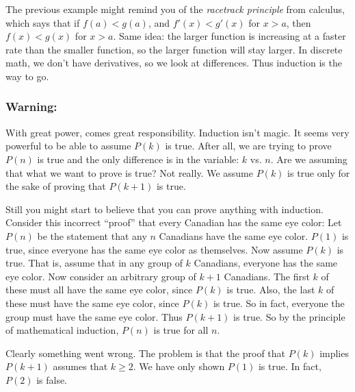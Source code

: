 \documentclass[10pt,]{book}
\theoremstyle{plain}
\theoremstyle{definition}
\theoremstyle{definition}
\theoremstyle{definition}
\numberwithin{equation}{chapter}
\newcommand{\lt}{ < }
\begin{document}
The previous example might remind you of the \emph{racetrack principle} from calculus, which says that if \(f(a) \lt  g(a)\), and \(f'(x) \lt  g'(x)\) for \(x > a\), then \(f(x) \lt  g(x)\) for \(x > a\). Same idea: the larger function is increasing at a faster rate than the smaller function, so the larger function will stay larger. In discrete math, we don't have derivatives, so we look at differences. Thus induction is the way to go.
%
\typeout{************************************************}
\typeout{************************************************}
\subsubsection[Warning:]{Warning:}\label{subsubsection-4}

With great power, comes great responsibility. Induction isn't magic. It seems very powerful to be able to assume \(P(k)\) is true. After all, we are trying to prove \(P(n)\) is true and the only difference is in the variable: \(k\) vs. \(n\). Are we assuming that what we want to prove is true? Not really. We assume \(P(k)\) is true only for the sake of proving that \(P(k+1)\) is true.
%
\par

Still you might start to believe that you can prove anything with induction. Consider this incorrect ``proof'' that every Canadian has the same eye color: Let \(P(n)\) be the statement that any \(n\) Canadians have the same eye color. \(P(1)\) is true, since everyone has the same eye color as themselves. Now assume \(P(k)\) is true. That is, assume that in any group of \(k\) Canadians, everyone has the same eye color. Now consider an arbitrary group of \(k+1\) Canadians. The first \(k\) of these must all have the same eye color, since \(P(k)\) is true. Also, the last \(k\) of these must have the same eye color, since \(P(k)\) is true. So in fact, everyone the group must have the same eye color. Thus \(P(k+1)\) is true. So by the principle of mathematical induction, \(P(n)\) is true for all \(n\).
%
\par

Clearly something went wrong. The problem is that the proof that \(P(k)\) implies \(P(k+1)\) assumes that \(k \ge 2\). We have only shown \(P(1)\) is true. In fact, \(P(2)\) is false.
%
\typeout{************************************************}
\typeout{************************************************}
\end{document}
